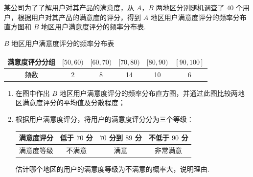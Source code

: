 \begin{problem}
某公司为了了解用户对其产品的满意度，从 \(A\)，\(B\) 两地区分别随机调查了 \(40\) 个用户，根据用户对其产品的满意度的评分，得到 \(A\) 地区用户满意度评分的频率分布直方图和 \(B\) 地区用户满意度评分的频率分布表.

\begin{center}
\(B\) 地区用户满意度评分的频率分布表
\begin{tabular}{c|ccccc}
\hline
满意度评分分组 & \([50, 60)\) & \([60, 70)\) & \([70, 80)\) & \([80, 90)\) & \([90, 100]\) \\
\hline
频数 & 2 & 8 & 14 & 10 & 6 \\
\hline
\end{tabular}
\end{center}

\begin{enumerate}
\item 在图中作出 \(B\) 地区用户满意度评分的频率分布直方图，并通过此图比较两地区满意度评分的平均值及分散程度；
\item 根据用户满意度评分，将用户的满意度评分分为三个等级：

\begin{center}
\begin{tabular}{c|ccc}
\hline
满意度评分 & 低于 \(70\) 分 & \(70\) 分到 \(89\) 分 & 不低于 \(90\) 分 \\
\hline
满意度等级 & 不满意 & 满意 & 非常满意 \\
\hline
\end{tabular}
\end{center}

估计哪个地区的用户的满意度等级为不满意的概率大，说明理由.
\end{enumerate}

\end{problem}

